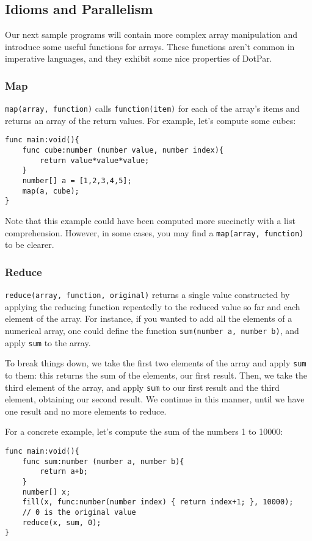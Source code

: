 \documentclass{article}
\begin{document}
\subsection{Idioms and Parallelism}
Our next sample programs will contain more complex array manipulation and introduce some useful functions for arrays. These functions aren’t common in imperative languages, and they exhibit some nice properties of DotPar.

\subsubsection{Map}
\verb!map(array, function)! calls \verb!function(item)! for each of the array’s items and returns an array of the return values.  For example, let’s compute some cubes:

\begin{verbatim}
func main:void(){
    func cube:number (number value, number index){
        return value*value*value;
    }
    number[] a = [1,2,3,4,5];
    map(a, cube);
}
\end{verbatim}

Note that this example could have been computed more succinctly with a list comprehension. However, in some cases, you may find a \verb!map(array, function)! to be clearer.

\subsubsection{Reduce}
\verb!reduce(array, function, original)! returns a single value constructed by applying the reducing function repeatedly to the reduced value so far and each element of the array. For instance, if you wanted to add all the elements of a numerical array, one could define the function \verb!sum(number a, number b)!, and apply \verb!sum! to the array.

To break things down, we take the first two elements of the array and apply \verb!sum! to them: this returns the sum of the elements, our first result. Then, we take the third element of the array, and apply \verb!sum! to our first result and the third element, obtaining our second result. We continue in this manner, until we have one result and no more elements to reduce.

For a concrete example, let’s compute the sum of the numbers 1 to 10000:

\begin{verbatim}
func main:void(){
    func sum:number (number a, number b){
        return a+b;
    }
    number[] x;
    fill(x, func:number(number index) { return index+1; }, 10000);
    // 0 is the original value
    reduce(x, sum, 0);
}
\end{verbatim}
\end{document}

